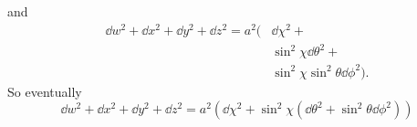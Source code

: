 %
and
%
\begin{align*}
    \dd w^2 + \dd x^2 + \dd y^2 + \dd z^2 = a^2( & \dd \chi^2 +                           \\
                                                 & \sin^2 \chi \dd \theta^2 +             \\
                                                 & \sin^2 \chi \sin^2 \theta \dd \phi^2).
\end{align*}
%
So eventually
%
\begin{equation}
    \boxed{\dd w^2 + \dd x^2 + \dd y^2 + \dd z^2 =
        a^2\left( \dd \chi^2 +
        \sin^2 \chi \left(\dd \theta^2 +
        \sin^2 \theta \dd \phi^2\right)\right)}
\end{equation}

\problem

\subproblem

